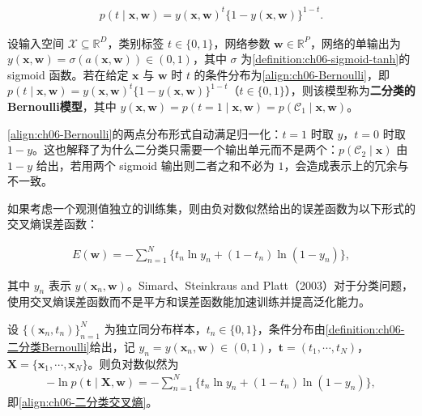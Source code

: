 \documentclass[../../main.tex]{subfiles}
\begin{document}
\begin{align}
p(t\mid\boldsymbol{x},\boldsymbol{w})=y(\boldsymbol{x},\boldsymbol{w})^{t}\bigl\{1-y(\boldsymbol{x},\boldsymbol{w})\bigr\}^{1-t}.
\label{align:ch06-Bernoulli}
\end{align}

\begin{definition}[二分类的Bernoulli模型]\label{definition:ch06-二分类Bernoulli}
设输入空间 $\mathcal{X}\subseteq\mathbb{R}^{D}$，类别标签 $t\in\{0,1\}$，网络参数 $\boldsymbol{w}\in\mathbb{R}^{P}$，网络的单输出为 $y(\boldsymbol{x},\boldsymbol{w})=\sigma(a(\boldsymbol{x},\boldsymbol{w}))\in(0,1)$，其中 $\sigma$ 为\cref{definition:ch06-sigmoid-tanh}的 sigmoid 函数。若在给定 $\boldsymbol{x}$ 与 $\boldsymbol{w}$ 时 $t$ 的条件分布为\eqref{align:ch06-Bernoulli}，即 $p(t\mid\boldsymbol{x},\boldsymbol{w})=y(\boldsymbol{x},\boldsymbol{w})^{t}\{1-y(\boldsymbol{x},\boldsymbol{w})\}^{1-t}$（$t\in\{0,1\}$），则该模型称为\textbf{二分类的Bernoulli模型}，其中 $y(\boldsymbol{x},\boldsymbol{w})=p(t=1\mid\boldsymbol{x},\boldsymbol{w})=p(\mathcal{C}_{1}\mid\boldsymbol{x},\boldsymbol{w})$。
\end{definition}

\begin{remark}\eqref{align:ch06-Bernoulli}的两点分布形式自动满足归一化：$t=1$ 时取 $y$，$t=0$ 时取 $1-y$。这也解释了为什么二分类只需要一个输出单元而不是两个：$p(\mathcal{C}_2\mid\boldsymbol{x})$ 由 $1-y$ 给出，若用两个 sigmoid 输出则二者之和不必为 $1$，会造成表示上的冗余与不一致。
\end{remark}

如果考虑一个观测值独立的训练集，则由负对数似然给出的误差函数为以下形式的交叉熵误差函数：

\begin{align}
E(\boldsymbol{w})=-\sum_{n=1}^{N}\bigl\{t_n\ln y_n+(1-t_n)\ln(1-y_n)\bigr\},
\label{align:ch06-二分类交叉熵}
\end{align}

其中 $y_n$ 表示 $y(\boldsymbol{x}_n,\boldsymbol{w})$。Simard、Steinkraus and Platt（2003）对于分类问题，使用交叉熵误差函数而不是平方和误差函数能加速训练并提高泛化能力。

\begin{proposition}[二分类的交叉熵误差]\label{proposition:ch06-二分类交叉熵}
设 $\{(\boldsymbol{x}_{n},t_{n})\}_{n=1}^{N}$ 为独立同分布样本，$t_{n}\in\{0,1\}$，条件分布由\cref{definition:ch06-二分类Bernoulli}给出，记 $y_{n}=y(\boldsymbol{x}_{n},\boldsymbol{w})\in(0,1)$，$\boldsymbol{t}=(t_{1},\cdots,t_{N})$，$\boldsymbol{X}=\{\boldsymbol{x}_{1},\cdots,\boldsymbol{x}_{N}\}$。则负对数似然为
\begin{align}
-\ln p(\boldsymbol{t}\mid\boldsymbol{X},\boldsymbol{w})=-\sum_{n=1}^{N}\bigl\{t_n\ln y_n+(1-t_n)\ln(1-y_n)\bigr\},
\label{align:ch06-二分类负对数}
\end{align}
即\eqref{align:ch06-二分类交叉熵}。
\end{proposition}
\end{document}
